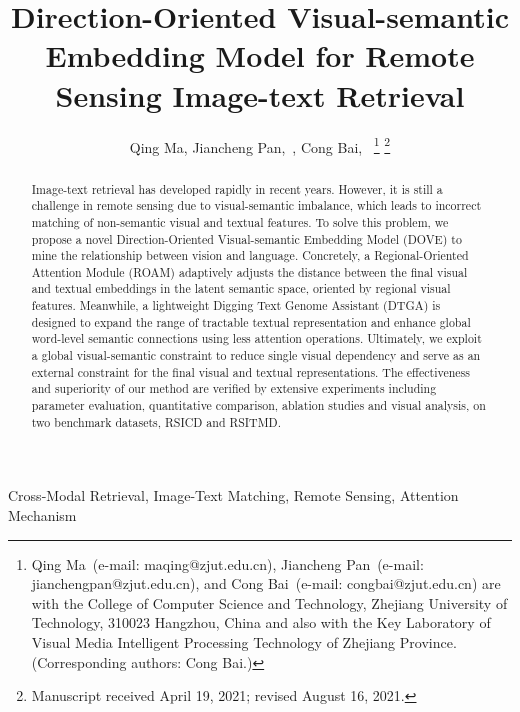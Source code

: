\documentclass[journal]{IEEEtran}
\begin{document}
\title{Direction-Oriented Visual-semantic Embedding Model for Remote Sensing Image-text Retrieval}

\author{
Qing Ma,
Jiancheng Pan\hspace{-1.5mm}\orcidA{},~,
Cong Bai\hspace{-1.5mm}\orcidB{},~
\thanks{Qing Ma~(e-mail: maqing@zjut.edu.cn), Jiancheng Pan~(e-mail: jianchengpan@zjut.edu.cn), and Cong Bai~(e-mail: congbai@zjut.edu.cn) are with the College of Computer Science and Technology, Zhejiang University of Technology, 310023 Hangzhou, China and also with the Key Laboratory of Visual Media Intelligent Processing Technology of Zhejiang Province. (Corresponding authors: Cong Bai.)}
\thanks{Manuscript received April 19, 2021; revised August 16, 2021.}}




\maketitle

\begin{abstract}
Image-text retrieval has developed rapidly in recent years. However, it is still a challenge in remote sensing due to visual-semantic imbalance, which leads to incorrect matching of non-semantic visual and textual features. To solve this problem, we propose a novel Direction-Oriented Visual-semantic Embedding Model (DOVE) to mine the relationship between vision and language. Concretely, a Regional-Oriented Attention Module (ROAM) adaptively adjusts the distance between the final visual and textual embeddings in the latent semantic space, oriented by regional visual features. Meanwhile, a lightweight Digging Text Genome Assistant (DTGA) is designed to expand the range of tractable textual representation and enhance global word-level semantic connections using less attention operations. Ultimately, we exploit a global visual-semantic constraint to reduce single visual dependency and serve as an external constraint for the final visual and textual representations. The effectiveness and superiority of our method are veriﬁed by extensive experiments including parameter evaluation, quantitative comparison, ablation studies and visual analysis, on two benchmark datasets, RSICD and RSITMD.
\end{abstract}

\begin{IEEEkeywords}
Cross-Modal Retrieval, Image-Text Matching, Remote Sensing, Attention Mechanism
\end{IEEEkeywords}
\end{document}
